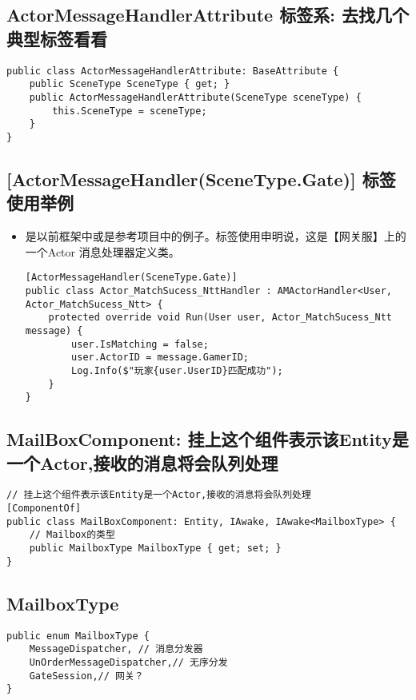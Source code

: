 \documentclass[9pt, b5paper]{article}
\begin{document}
\subsection{ActorMessageHandlerAttribute 标签系: 去找几个典型标签看看}
\label{sec-1-12}
\begin{verbatim}
public class ActorMessageHandlerAttribute: BaseAttribute {
    public SceneType SceneType { get; }
    public ActorMessageHandlerAttribute(SceneType sceneType) {
        this.SceneType = sceneType;
    }
}
\end{verbatim}
\subsection{[ActorMessageHandler(SceneType.Gate)] 标签使用举例}
\label{sec-1-13}
\begin{itemize}
\item 是以前框架中或是参考项目中的例子。标签使用申明说，这是【网关服】上的一个Actor 消息处理器定义类。
\begin{verbatim}
[ActorMessageHandler(SceneType.Gate)]
public class Actor_MatchSucess_NttHandler : AMActorHandler<User, Actor_MatchSucess_Ntt> {
    protected override void Run(User user, Actor_MatchSucess_Ntt message) {
        user.IsMatching = false;
        user.ActorID = message.GamerID;
        Log.Info($"玩家{user.UserID}匹配成功");
    }
}
\end{verbatim}
\end{itemize}
\subsection{MailBoxComponent: 挂上这个组件表示该Entity是一个Actor,接收的消息将会队列处理}
\label{sec-1-14}
\begin{verbatim}
// 挂上这个组件表示该Entity是一个Actor,接收的消息将会队列处理
[ComponentOf]
public class MailBoxComponent: Entity, IAwake, IAwake<MailboxType> {
    // Mailbox的类型
    public MailboxType MailboxType { get; set; }
}
\end{verbatim}
\subsection{MailboxType}
\label{sec-1-15}
\begin{verbatim}
public enum MailboxType {
    MessageDispatcher, // 消息分发器
    UnOrderMessageDispatcher,// 无序分发
    GateSession,// 网关？
}
\end{verbatim}
\end{document}
